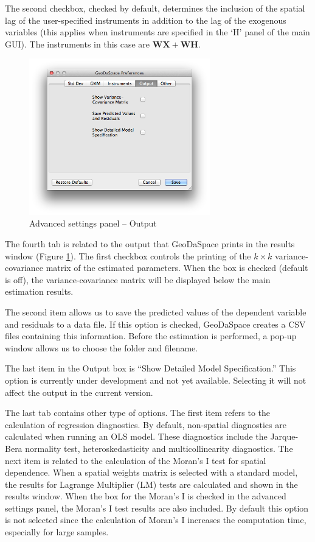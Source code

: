 \documentclass{article}
\begin{document}
The second checkbox, checked by default, determines the inclusion of the spatial lag of the user-specified instruments in addition to the lag of the exogenous variables (this applies when instruments are specified in the `H' panel of the main GUI). The instruments in this case are $\mathbf{WX} + \mathbf{WH}$.
\FloatBarrier

\begin{figure}[htb]
\centering
\includegraphics[width=0.7\textwidth]{adv_out.png}
\caption{Advanced settings panel -- Output}
\label{f:adv_out}
\end{figure}
\FloatBarrier

The fourth tab is related to the output that GeoDaSpace prints in the results window (Figure \ref{f:adv_out}).  The first checkbox controls the printing of the $k \times k$ variance-covariance matrix of the estimated parameters. When the box is checked (default is off), the variance-covariance matrix will be displayed below the main estimation results.

The second item allows us to save the predicted values of the dependent variable and residuals to a data file. If this option is checked, GeoDaSpace creates a CSV files containing this information. Before the estimation is performed, a pop-up window allows us to choose the folder and filename.

The last item in the Output box is ``Show Detailed Model Specification.'' This option is currently under development and not yet available. Selecting it will not affect the output in the current version.

The last tab contains other type of options. The first item refers to the calculation of regression diagnostics. By default, non-spatial diagnostics are calculated when running an OLS model. These diagnostics include the Jarque-Bera normality test, heteroskedasticity and multicollinearity diagnostics. The next item is related to the calculation of the Moran's I test for spatial dependence. When a spatial weights matrix is selected with a standard model, the results for Lagrange Multiplier (LM) tests are calculated and shown in the results window. When the box for the Moran's I is checked in the advanced settings panel, the Moran's I test results are also included. By default this option is not selected since the calculation of Moran's I increases the computation time, especially for large samples.
\end{document}
